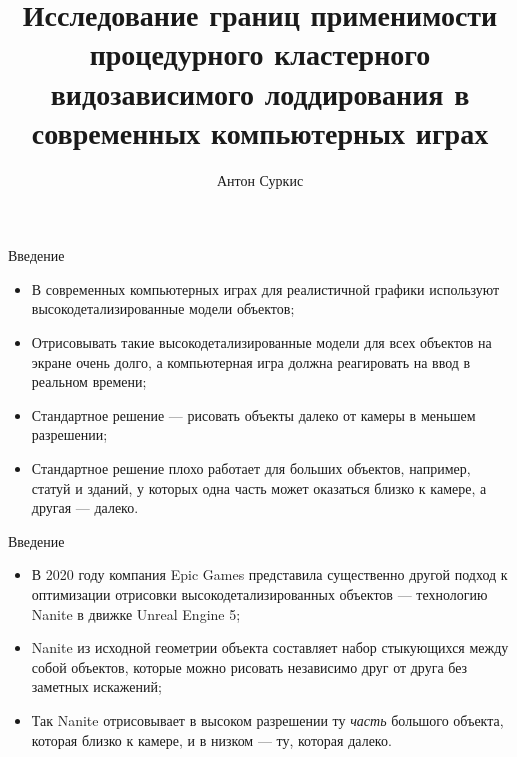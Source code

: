 \documentclass{beamer}
\title{Исследование границ применимости процедурного кластерного видозависимого лоддирования в современных компьютерных играх}
\author{Антон Суркис}
\begin{document}
    \maketitle

    \begin{frame}{Введение}
        \begin{itemize}
            \item
            В современных компьютерных играх для реалистичной графики
            используют высокодетализированные модели объектов;

            \item
            Отрисовывать такие высокодетализированные модели для
            всех объектов на экране очень долго,
            а компьютерная игра должна реагировать на ввод
            в реальном времени;

            \item
            Стандартное решение --- рисовать объекты
            далеко от камеры в меньшем разрешении;

            \item
            Стандартное решение плохо работает для
            больших объектов, например, статуй и зданий,
            у которых одна часть может оказаться близко
            к камере, а другая --- далеко.
        \end{itemize}
    \end{frame}

    \begin{frame}{Введение}
        \begin{itemize}
            \item В 2020 году компания Epic Games представила
            существенно другой подход к оптимизации
            отрисовки высокодетализированных объектов
            --- технологию Nanite в движке Unreal Engine 5;

            \item Nanite из исходной геометрии объекта
            составляет набор стыкующихся между собой объектов,
            которые можно рисовать независимо
            друг от друга без заметных искажений;

            \item Так Nanite отрисовывает в высоком разрешении
            ту \emph{часть} большого объекта, которая близко к камере,
            и в низком --- ту, которая далеко.
        \end{itemize}
    \end{frame}
\end{document}
